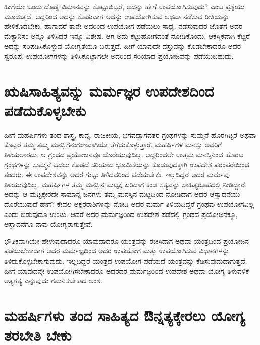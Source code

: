 ಹೀಗೆಯೇ ಒಂದು ದೊಡ್ಡ ವಿಮಾನವನ್ನು ಕೊಟ್ಟುಬಿಟ್ಟರೆ, ಅದನ್ನು ಹೇಗೆ ಉಪಯೋಗಿಸುವುದು? ಎಂಬ ಪ್ರಶ್ನೆಯು ಮೂಡುತ್ತದೆ. ಆದ್ದರಿಂದ ಅದನ್ನು ಕೊಡುವಾಗ ಅದನ್ನು ಉಪಯೋಗಿಸುವ ಅಥವಾ ನಡೆಸುವ ರೀತಿಯನ್ನು ಹೇಳಿಕೊಡಬೇಕು. ಹಾಗಾದರೆ ತಾನೇ ಅದರಿಂದ ಉಪಯೋಗ ಪಡೆಯಲು ಸಾಧ್ಯ. ನಡೆಸುವುದರ ಜೊತೆಗೆ ಅದರ ಮೆಕ್ಯಾನಿಸಂ ಅನ್ನೂ ತಿಳಿಸಿದರೆ ಇನ್ನೂ ವಿಶೇಷ. ಆಗ ಅದು ಕೆಟ್ಟುಹೋಗದಂತೆ ನೋಡಿಕೊಂದು, ಆಕಸ್ಮಿಕವಾಗಿ ಕೆಟ್ಟರೆ ಅದನ್ನು ಸರಿಪಡಿಸಿಕೊಳ್ಳುವ ಯೋಗ್ಯತೆಯೂ ಬರುತ್ತದೆ. ಹೀಗೆ ಯಾವುದೇ ವಸ್ತುವನ್ನು ಕೊಡಬೇಕಾದರೂ ಅದರ ಸ್ವರೂಪ, ಉಪಯೋಗಗಳನ್ನು ತಿಳಿಸಿಕೊಟ್ಟಾಗಲೇ ಅದರಿಂದ ಸರಿಯಾದ ಪ್ರಯೋಜವನ್ನು ಪಡೆಯುಬಹುದು. 

\section*{ಋಷಿಸಾಹಿತ್ಯವನ್ನು ಮರ್ಮಜ್ಞರ ಉಪದೇಶದಿಂದ ಪಡೆದುಕೊಳ್ಳಬೇಕು}

ಹೀಗೆ ಮಹರ್ಷಿಗಳು ತಂದ ಶಾಸ್ತ್ರ, ಕಾವ್ಯ, ರಾಜಕೀಯ, ಭಗವದ್ಭಾಗವತರ ಗ್ರಂಥಗಳನ್ನು ಸುಮ್ಮನೆ ಹೊರಗಿಟ್ಟರೆ ಅಥವಾ ಕೊಟ್ಟರೆ ತಮ್ಮ ತಮ್ಮ ಮನಸ್ಸಿಗನುಗುಣವಾಗಿಯೇ ತೆಗೆದುಕೊಳ್ಳುತ್ತಾರೆ. ಮಹರ್ಷಿಗಳ ಮನಸ್ಸು ಅವರಿಗೆ ತಿಳಿಯಲಾರದು. ಆ ಗ್ರಂಥದ ಪ್ರಯೋಜನವೂ ದೊರೆಯುವುದಿಲ್ಲ. ಆದ್ದರಿಂದಲೇ ಉತ್ತಮ ಮನಸ್ಸಿನಿಂದ ಹೊರಟ ಗ್ರಂಥಗಳನ್ನು ಸುಮ್ಮನೆ ಓದಲು ಕೊಡದೆ ಸರಿಯಾದ ಭೂಮಿಕೆಯನ್ನು ಕೊಡುವುದಕ್ಕಾಗಿ ಉಪದೇಶ ಪರಂಪರೆಯಿಂದ ತಂದರು. ಈ ಉಪದೇಶವನ್ನು ಅದರ ಗುಟ್ಟು ತಿಳಿದವರಿಂದ ಪಡೆಯಬೇಕು. ಇಲ್ಲದಿದ್ದರೆ ಅದರ ಮರ್ಮವು ತಿಳಿಯುವುದಿಲ್ಲ. ಮಹರ್ಷಿಗಳ ತಮ್ಮ ಮನಸ್ಸಿನ ಮಟ್ಟಕ್ಕೆ ಏರಿದಾಗ ಕಂಡ ಸತ್ಯವನ್ನು ಸಾಹಿತ್ಯರೂಪದಲ್ಲಿ ನೀಡಿದ್ದಾರೆ. ಅದನ್ನು ಆ ಮಟ್ಟಕ್ಕೇರದೇ ಸಾಮಾನ್ಯ ಜನಗಳು ತಮ್ಮ ಮನಸ್ಸಿನ ಮಟ್ಟದಿಂದ ನೋಡಿದಾಗ ಅದರ ಆಸ್ವಾದನೆಯು ದೊರೆಯುವುದೆ ಹೇಗೆ? ಕೇವಲ ಅಕ್ಷರರಾಶಿಗಳನ್ನು ನೋಡಿ ಅದರ ಮರ್ಮ ತಿಳಿಯದಿದ್ದರೆ ಗ್ರಂಥವು ಉಪಯೋಗವಿಲ್ಲ ಎಂದು ಬಿಡುವುದೂ ಉಂಟು. ಆದರೆ ಅದರ ಮರ್ಮಜ್ಞರಿಂದ ಉಪದೇಶ ಪಡೆದಲ್ಲಿ ಗ್ರಂಥದ ಪ್ರಯೋಜನಕ್ಕೂ, ಆಸ್ವಾದನೆಗೂ ನಾವು ಯೋಗ್ಯರಾಗುತ್ತೇವೆ. 

ಭೌತಿಕವಾಗಿಯೇ ಹೇಳುವುದಾದರೂ ಯಾವುದಾದರೂ ಯಂತ್ರವನ್ನು ರಚಿಸಿದಾಗ ಅಥವಾ ಯಂತ್ರದಿಂದ ಪ್ರಯೋಜನ ಪಡೆಯಬೇಕಾದಾಗ ಅದರ ಮರ್ಮಜ್ಞದಿಂದ ಅದರ ಉಪಯೋಗ ಮತ್ತು ಉಪಯೋಗಿಸುವ ವಿಧಾನಗಳನ್ನು ತಿಳಿದುಕೊಳ್ಳಬೇಕಾಗುವುದು. ಇಲ್ಲದಿದ್ದರೆ ಯಂತ್ರದ ಉಪಯೋಗ ಪಡೆಯದೆ ಯಂತ್ರವನ್ನು ಕೆಡಿಸುವುದುದಾಗುತ್ತದೆ. ಹೀಗೆ ಯಾವುದನ್ನೇ ಉಪಯೋಗಿಸಬೇಕಾದರೂ ಅದರದರ ಮರ್ಮಜ್ಞರಿಂದ ಉಪದೇಶ ಅಥವಾ ಯೋಗ್ಯ ತಿಳುವಳಿಕೆ ಅತ್ಯಗತ್ಯ ಎನ್ನುವುದು ಗಮನಿಸಬೇಕಾದ ಅಂಶ. 

\section*{ಮಹರ್ಷಿಗಳು ತಂದ ಸಾಹಿತ್ಯದ ಔನ್ನತ್ಯಕ್ಕೇರಲು ಯೋಗ್ಯ ತರಬೇತಿ ಬೇಕು}

